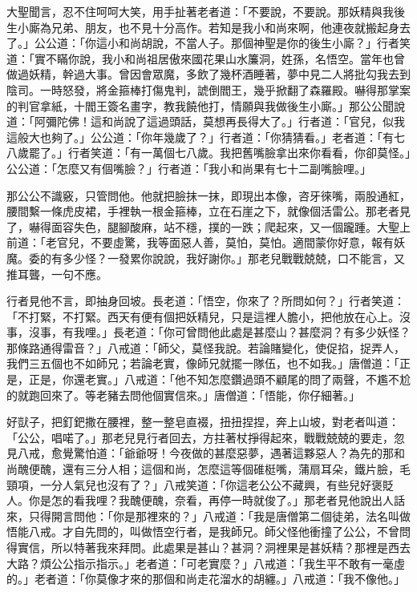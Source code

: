 大聖聞言，忍不住呵呵大笑，用手扯著老者道：「不要說，不要說。那妖精與我後生小廝為兄弟、朋友，也不見十分高作。若知是我小和尚來啊，他連夜就搬起身去了。」公公道：「你這小和尚胡說，不當人子。那個神聖是你的後生小廝？」行者笑道：「實不瞞你說，我小和尚祖居傲來國花果山水簾洞，姓孫，名悟空。當年也曾做過妖精，幹過大事。曾因會眾魔，多飲了幾杯酒睡著，夢中見二人將批勾我去到陰司。一時怒發，將金箍棒打傷鬼判，諕倒閻王，幾乎掀翻了森羅殿。嚇得那掌案的判官拿紙，十閻王簽名畫字，教我饒他打，情願與我做後生小廝。」那公公聞說道：「阿彌陀佛！這和尚說了這過頭話，莫想再長得大了。」行者道：「官兒，似我這般大也夠了。」公公道：「你年幾歲了？」行者道：「你猜猜看。」老者道：「有七八歲罷了。」行者笑道：「有一萬個七八歲。我把舊嘴臉拿出來你看看，你卻莫怪。」公公道：「怎麼又有個嘴臉？」行者道：「我小和尚果有七十二副嘴臉哩。」

那公公不識竅，只管問他。他就把臉抹一抹，即現出本像，咨牙徠嘴，兩股通紅，腰間繫一條虎皮裙，手裡執一根金箍棒，立在石崖之下，就像個活雷公。那老者見了，嚇得面容失色，腿腳酸麻，站不穩，撲的一跌；爬起來，又一個躘踵。大聖上前道：「老官兒，不要虛驚，我等面惡人善，莫怕，莫怕。適間蒙你好意，報有妖魔。委的有多少怪？一發累你說說，我好謝你。」那老兒戰戰兢兢，口不能言，又推耳聾，一句不應。

行者見他不言，即抽身回坡。長老道：「悟空，你來了？所問如何？」行者笑道：「不打緊，不打緊。西天有便有個把妖精兒，只是這裡人膽小，把他放在心上。沒事，沒事，有我哩。」長老道：「你可曾問他此處是甚麼山？甚麼洞？有多少妖怪？那條路通得雷音？」八戒道：「師父，莫怪我說。若論賭變化，使促掐，捉弄人，我們三五個也不如師兄；若論老實，像師兄就擺一隊伍，也不如我。」唐僧道：「正是，正是，你還老實。」八戒道：「他不知怎麼鑽過頭不顧尾的問了兩聲，不尷不尬的就跑回來了。等老豬去問他個實信來。」唐僧道：「悟能，你仔細著。」

好獃子，把釘鈀撒在腰裡，整一整皂直裰，扭扭捏捏，奔上山坡，對老者叫道：「公公，唱喏了。」那老兒見行者回去，方拄著杖掙得起來，戰戰兢兢的要走，忽見八戒，愈覺驚怕道：「爺爺呀！今夜做的甚麼惡夢，遇著這夥惡人？為先的那和尚醜便醜，還有三分人相；這個和尚，怎麼這等個碓梃嘴，蒲扇耳朵，鐵片臉，毛頸項，一分人氣兒也沒有了？」八戒笑道：「你這老公公不藏興，有些兒好褒貶人。你是怎的看我哩？我醜便醜，奈看，再停一時就俊了。」那老者見他說出人話來，只得開言問他：「你是那裡來的？」八戒道：「我是唐僧第二個徒弟，法名叫做悟能八戒。才自先問的，叫做悟空行者，是我師兄。師父怪他衝撞了公公，不曾問得實信，所以特著我來拜問。此處果是甚山？甚洞？洞裡果是甚妖精？那裡是西去大路？煩公公指示指示。」老者道：「可老實麼？」八戒道：「我生平不敢有一毫虛的。」老者道：「你莫像才來的那個和尚走花溜水的胡纏。」八戒道：「我不像他。」

